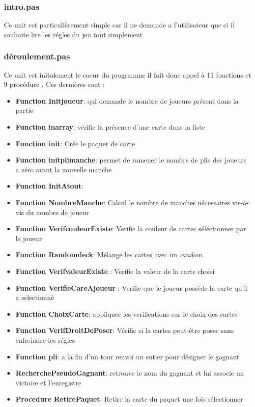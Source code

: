 \documentclass[12pt]{report}
\begin{document}
   	\subsubsection{intro.pas}
   	Ce unit est particulièrement simple car il ne demande a l'utilisateur que si il souhaite lire les régles du jeu tout simplement 
 	\subsubsection{déroulement.pas}
  Ce unit est initalement le coeur du programme il fait donc appel à 11 fonctions et 9 procédure . Ces dernières sont :
  
  \begin{itemize}
  \item \textbf{Function Initjoueur}: qui demande le nombre de joueurs présent dans la partie 
  \item \textbf{Function inarray}: vérifie la présence d'une carte dans la liste
  \item \textbf{Function init}: Crée le paquet de carte 
  \item \textbf{Function initplimanche}: permet de ramener le nombre de plis des joueurs a zéro avant la nouvelle manche
  \item \textbf{Function InitAtout}:
  \item \textbf{Function NombreManche}: Calcul le nombre de manches nécessaires vis-à-vis du nombre de joueur
  \item \textbf{Function VerifcouleurExiste}: Verifie la couleur de cartes séléctionner par le joueur
  \item \textbf{Function Randomdeck}: Mélange les cartes avec un 		   \textit{random}
  \item \textbf{Function VerifvaleurExiste} : Verifie la valeur de la carte choisi
  \item \textbf{Function VerifieCareAjoueur} : Verifie que le joueur possède la carte qu'il a selectionné 
  \item \textbf{Function ChoixCarte}: appliques les verifications sur le choix des cartes 
  \item \textbf{Function VerifDroitDePoser}: Vérifie si la cartes peut-être poser sans enfreindre les régles 
  \item \textbf{Function pli}: a la fin d'un tour renvoi un entier pour désigner le gagnant 
  \item \textbf{RecherchePseudoGagnant}: retrouve le nom du gagnant et lui associe un victoire et l'enregistre 
  \item \textbf{Procedure RetirePaquet}: Retire la carte du paquet une fois sélectionner 

\end{itemize}
\end{document}
